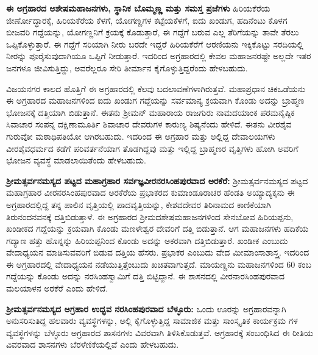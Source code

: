 \textbf{ಈ ಅಗ್ರಹಾರದ ಅಶೇಷಮಹಾಜನಗಳು, ಸ್ಥಾನಿಕ ಬೊಮ್ಮಣ್ಣ ಮತ್ತು ಸಮಸ್ತ ಪ್ರಜೆಗಳು} ಹಿರಿಯಕೆರೆಯ ಜೀರ್ಣೋದ್ಧಾರಕ್ಕೆ, ಹಿರಿಯಕೆರೆಯ ಕೆಳಗೆ, ಯೋಗಣ್ಣಗಳ ಕಟ್ಟೆಯಕೆಳಗೆ, ಐದು ಖಂಡುಗ, ಹದಿನೆಂಟು ಕೊಳಗ ಬೀಜವರಿ ಗದ್ದೆಯನ್ನು, ಯೋಗಣ್ಣನಿಗೆ ಕ್ರಯಕ್ಕೆ ಕೊಡುತ್ತಾರೆ, ಈ ಗದ್ದೆಗೆ ಬರುವ ಎಲ್ಲ ತೆರಿಗೆಯನ್ನು ತಾವೇ ತೆರಲು ಒಪ್ಪಿಕೊಳ್ಳುತ್ತಾರೆ. ಈ ಗದ್ದೆಗೆ ಸರಿಯಾಗಿ ನೀರು ಬರದೇ ಇದ್ದರೆ ಹಿರಿಯಕೆರೆಗೆ ಆರಣಿಯನು ಇಕ್ಕಿಕೊಟ್ಟು ಸರದಿಯಲ್ಲಿ ನೀರನ್ನು ಪೂರೈಸುವುದಾಗಿಯೂ ಒಪ್ಪಿಗೆ ನೀಡುತ್ತಾರೆ. ಇದರಿಂದ ಅಗ್ರಹಾರದಲ್ಲಿ ಕೇವಲ ಮಹಾಜನರಷ್ಟೇ ಅಲ್ಲದೇ ಇತರ ಜನಗಳೂ ಜೀವಿಸುತ್ತಿದ್ದು, ಅವರೆಲ್ಲರೂ ಸೇರಿ ತೀರ್ಮಾನ ಕೈಗೊಳ್ಳುತ್ತಿದ್ದರೆಂದು ಹೇಳಬಹುದು.

ವಿಜಯನಗರ ಕಾಲದ ಹೊತ್ತಿಗೆ ಈ ಅಗ್ರಹಾರದಲ್ಲಿ ಕೆಲವು ಬದಲಾವಣೆಗಳಾಗಿರುತ್ತವೆ. ಮಹಾಪ್ರಧಾನ ಚಿಕಒಡೆಯನು ಈ ಅಗ್ರಹಾರದ ಮಹಾಜನಗಳಿಂದ ಐದು ಖಂಡುಗ ಗದ್ದೆಯನ್ನು ಸರ್ವಮಾನ್ಯ ಕ್ರಯವಾಗಿ ಕೊಂಡು ಅದನ್ನು ಬ್ರಾಹ್ಮಣ ಭೋಜನಕ್ಕೆ ದತ್ತಿಯಾಗಿ ಬಿಡುತ್ತಾನೆ. ಈತನು ಶ‍್ರೀಮನ್​ ಮಹಾರಾಯ ರಾಜಗುರು ನಾಮದಯಾಂಕ ಪರಮನೈಷ್ಠಿಕ ಸಿವಾಚಾರ ಸಂಪನ್ನ ದಕ್ಷಿಣಾಮೂರ್ತಿ ಶಿವಾಚಾರ ದೇವರುಗಳ ಕಾರುಣ್ಯ ಶಿಷ್ಯನೆಂದು ಹೇಳಿದೆ. ಈತನು ವೀರಶೈವ ಗುರುವೋ ಮಠಾಧಿಪತಿಯೋ ಆಗಿರಬಹುದು. ಇದರಿಂದ ಈ ಅಗ್ರಹಾರ ಮತ್ತು ಅಲ್ಲಿದ್ದ ದೇವಾಲಯಗಳು ವೀರಶೈವಧರ್ಮದ ಕಡೆಗೆ ಪರಿವರ್ತನೆಯಾಗ ತೊಡಗಿದ್ದವು ಮತ್ತು ಇಲ್ಲಿದ್ದ ಬ್ರಾಹ್ಮಣರ ವೃತ್ತಿಗಳು ಹೋಗಿ ಅವರಿಗೆ ಭೋಜನ ವ್ಯವಸ್ಥೆ ಮಾಡಲಾಯಿತೆಂದು ಹೇಳಬಹುದು.

\textbf{ಶ‍್ರೀಮತ್ಸರ್ವನಮಸ್ಯದ ಪಟ್ಟದ ಮಹಾಗ್ರಹಾರ ಸರ್ವಜ್ಞವೀರನರಸಿಂಹಪುರವಾದ ಅರಕೆರೆ:} ಶ‍್ರೀಮತ್ಸರ್ವನಮಸ್ಯದ ಪಟ್ಟದ ಮಹಾಗ್ರಹಾರ ವೀರನರಸಿಂಹಪುರವಾದ ಅರಕೆರೆಯ ಪ್ರಭಾಕರದ ಕುಮಾಂಡೂರಾಚರ ಹೆಂಡತಿ ಅಯ್ಯಾದ್ಯಕ್ಕನು ಈ ಅಗ್ರಹಾರದಲ್ಲಿದ್ದ ತನ್ನ ಪಾಲಿನ ವೃತ್ತಿಯಲ್ಲಿ ಪಾದವೃತ್ತಿಯನ್ನು, ಕೇಶವದೇವರ ತಿರಿನಾಮದ ಕಾಣಿಕೆಯಾಗಿ ತಿರುನಂದನವನಕ್ಕೆ ದತ್ತಿಬಿಡುತ್ತಾಳೆ. ಈ ಅಗ್ರಹಾರದ ಶ‍್ರೀಮದಶೇಷಮಹಾಜನಗಳಿಂದ ಸೇನಬೋವ ಹಿರಿಯಪ್ಪನು, ಖಂಡೀಕದ ಗದ್ದೆಯನ್ನು ಕ್ರಯವಾಗಿ ಕೊಂಡು ಮಣಳೇಶ್ವರ ದೇವರಿಗೆ ದತ್ತಿ ಬಿಡುತ್ತಾನೆ. ಆಗ ಮಹಾಜನಗಳು ಹದಿಕೆಯ ಗದ್ಯಾಣ ಹತ್ತು ಹೊನ್ನನ್ನು ಹಿರಿಯಪ್ಪನಿಂದ ಕೊಂಡು ಅದನ್ನು ಅಕರವಾಗಿ ದತ್ತಿಬಿಡುತ್ತಾರೆ. ಖಂಡೀಕ ಎಂಬುದು ವೇದಾಧ್ಯಯನ ಮಾಡಿಸುವವರಿಗೆ ಬಿಡುವ ದತ್ತಿಯ ಹೆಸರು. ಪ್ರಭಾಕರ ಎಂಬುದು ವೇದ ಮೀಮಾಂಸಾಶಾಸ್ತ್ರ. ಇದರಿಂದ ಈ ಅಗ್ರಹಾರದಲ್ಲಿ ವೇದಾಧ್ಯಯನ ನಡೆಯುತ್ತಿತ್ತೆಂಬುದು ಖಚಿತವಾಗುತ್ತದೆ. ಮಾಯಣ್ಣನು ಮಹಾಜನಗಳಿಂದ 60 ಕಂಬ ಗದ್ದೆಯನ್ನು ಕೊಂಡು ಅದನ್ನು ನರಸಿಂಹಸ್ವಾಮಿಗೆ ದತ್ತಿ ಬಿಟ್ಟಿದ್ದಾನೆ. ಈ ಶಾಸನದಲ್ಲಿ ವೀರನಾರಸಿಂಹಪುರವಾದ ಮಲಯಾಳನ ಅರಕೆರೆ ಎಂದು ಹೇಳಿದೆ.

\textbf{ಶ‍್ರೀಮತ್ಸರ್ವನಮಸ್ಯದ ಅಗ್ರಹಾರ ಉದ್ಭವ ನರಸಿಂಹಪುರವಾದ ಬೆಳ್ಳೂರು:} ಒಂದು ಊರನ್ನು ಅಗ್ರಹಾರವನ್ನಾಗಿ ಅನುಸರಿಸುತಿದ್ದ ಹಲವಾರು ವ್ಯವಸ್ಥೆಗಳನ್ನು, ಅಲ್ಲಿ ಕೈಗೊಳ್ಳುತ್ತಿದ್ದ ಸಾಮಾಜಿಕ ಮತ್ತು ಸಾಂಸ್ಕೃತಿಕ ಕಾರ್ಯಕ್ರಮ ಗಳ ವ್ಯವಸ್ಥೆಗಳನ್ನು ಬೆಳ್ಳೂರು ಅಗ್ರಹಾರದ ಶಾಸನಗಳು ವಿವರವಾಗಿ ತಿಳಿಸಿಕೊಡುತ್ತವೆ. ಅಗ್ರಹಾರಕ್ಕೆ ಸಂಬಂಧಿಸಿದ ಈ ರೀತಿಯ ವಿವರವಾದ ಶಾಸನಗಳು ಬೆರಳೆಣಿಕೆಯಲ್ಲಿವೆ ಎಂದು ಹೇಳಬಹುದು. 

